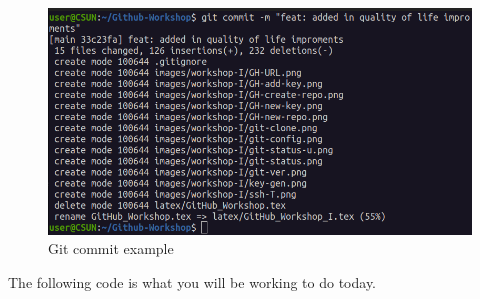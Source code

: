 \documentclass[12pt, a4paper]{article}
\begin{document}
\begin{figure}[H]
\centering
\includegraphics[scale=0.5]{../images/workshop-I/git-commit.png}
\caption{Git commit example}
\end{figure}
\clearpage 
The following code is what you will be working to do today.
\end{document}
